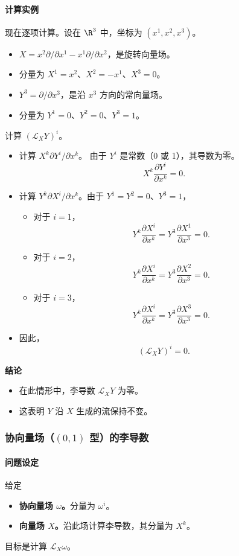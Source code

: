 \paragraph{计算实例}
现在逐项计算。设在 $\R^3$ 中，坐标为 $(x^1,x^2,x^3)$。
\begin{itemize}
  \item $X=x^2\partial/\partial x^1-x^1\partial/\partial x^2$，是旋转向量场。
  \item 分量为 $X^1=x^2$、$X^2=-x^1$、$X^3=0$。
  \item $Y^3=\partial/\partial x^3$，是沿 $x^3$ 方向的常向量场。
  \item 分量为 $Y^1=0$、$Y^2=0$、$Y^3=1$。
\end{itemize}
计算 $(\mathcal L_X Y)^i$。
\begin{itemize}
  \item 计算 $X^k\partial Y^i/\partial x^k$。
  由于 $Y^i$ 是常数（0 或 1），其导数为零。
  \[
    X^k\frac{\partial Y^i}{\partial x^k}=0.
  \]
  \item 计算 $Y^k\partial X^i/\partial x^k$。由于 $Y^1=Y^2=0$、$Y^3=1$，
  \begin{itemize}
    \item 对于 $i=1$，
    \[
      Y^k\frac{\partial X^i}{\partial x^k}
      =Y^3\frac{\partial X^1}{\partial x^3}=0.
    \]
    \item 对于 $i=2$，
    \[
      Y^k\frac{\partial X^i}{\partial x^k}
      =Y^3\frac{\partial X^2}{\partial x^3}=0.
    \]
    \item 对于 $i=3$，
    \[
      Y^k\frac{\partial X^i}{\partial x^k}
      =Y^3\frac{\partial X^3}{\partial x^3}=0.
    \]
  \end{itemize}
  \item 因此，
  \[
    (\mathcal L_X Y)^i=0.
  \]
\end{itemize}

\textbf{结论}
\begin{itemize}
  \item 在此情形中，李导数 $\mathcal L_XY$ 为零。
  \item 这表明 $Y$ 沿 $X$ 生成的流保持不变。
\end{itemize}

\subsubsection{协向量场（$(0,1)$ 型）的李导数}
\paragraph{问题设定}
给定
\begin{itemize}
  \item \textbf{协向量场 $\omega$。}分量为 $\omega^i$。
  \item \textbf{向量场 $X$。}沿此场计算李导数，其分量为 $X^k$。
\end{itemize}
目标是计算 $\mathcal L_X\omega$。

